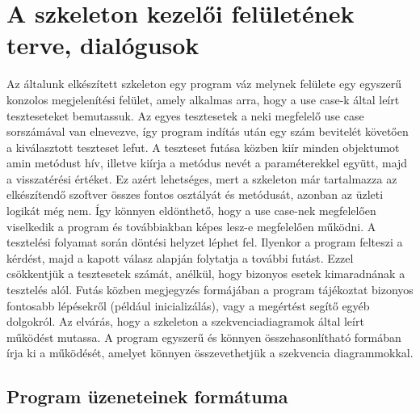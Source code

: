 \section{A szkeleton kezelői felületének terve, dialógusok}
Az általunk elkészített szkeleton egy program váz melynek felülete egy egyszerű konzolos megjelenítési felület, amely alkalmas arra, hogy a use case-k által leírt teszteseteket bemutassuk. Az egyes tesztesetek a neki megfelelő use case sorszámával van elnevezve, így program indítás után egy szám bevitelét követően a kiválasztott teszteset lefut. 
A teszteset futása közben kiír minden objektumot amin metódust hív, illetve kiírja a metódus nevét a paraméterekkel együtt, majd a visszatérési értéket. Ez azért lehetséges, mert a szkeleton már tartalmazza az elkészítendő szoftver összes fontos osztályát és metódusát, azonban az üzleti logikát még nem. Így könnyen eldönthető, hogy a use case-nek megfelelően viselkedik a program és továbbiakban képes lesz-e megfelelően működni.
A tesztelési folyamat során döntési helyzet léphet fel. Ilyenkor a program felteszi a kérdést, majd a kapott válasz alapján folytatja a további futást. Ezzel csökkentjük a tesztesetek számát, anélkül, hogy bizonyos esetek kimaradnának a tesztelés alól. 
Futás közben megjegyzés formájában a program tájékoztat bizonyos fontosabb lépésekről (például inicializálás), vagy a megértést segítő egyéb dolgokról.
Az elvárás, hogy a szkeleton a szekvenciadiagramok által leírt működést mutassa. A program egyszerű és könnyen összehasonlítható formában írja ki a működését, amelyet könnyen összevethetjük a szekvencia diagrammokkal.

\subsection{Program üzeneteinek formátuma}

